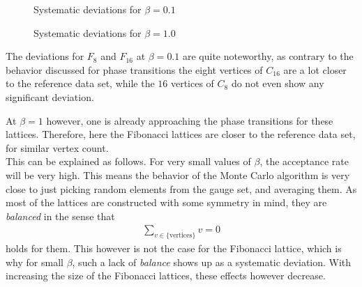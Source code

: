\begin{figure}[!hbt]
 \centering
 
 \caption{Systematic deviations for $\beta = 0.1$}
 \label{plot:systemBeta01}
\end{figure}
\begin{figure}[!hbt]
 \centering
 
 \caption{Systematic deviations for $\beta = 1.0$}
 \label{plot:systemBeta10}
\end{figure}

The deviations for $F_8$ and $F_{16}$ at $\beta=0.1$ are quite noteworthy, as contrary to the behavior discussed for phase transitions the eight vertices of $C_{16}$ are a lot closer to the reference data set, while the $16$ vertices of $C_8$ do not even show any significant deviation.

At $\beta=1$ however, one is already approaching the phase transitions for these lattices. Therefore, here the Fibonacci lattices are closer to the reference data set, for similar vertex count.\\

This can be explained as follows. For very small values of $\beta$, the acceptance rate will be very high. This means the behavior of the Monte Carlo algorithm is very close to just picking random elements from the gauge set, and averaging them. As most of the lattices are constructed with some symmetry in mind, they are \emph{balanced} in the sense that
\begin{align*}
 \sum_{v \in \{\textrm{vertices}\}} v = 0
\end{align*}
holds for them. This however is not the case for the Fibonacci lattice, which is why for small $\beta$, such a lack of \emph{balance} shows up as a systematic deviation. With increasing the size of the Fibonacci lattices, these effects however decrease.

\FloatBarrier
